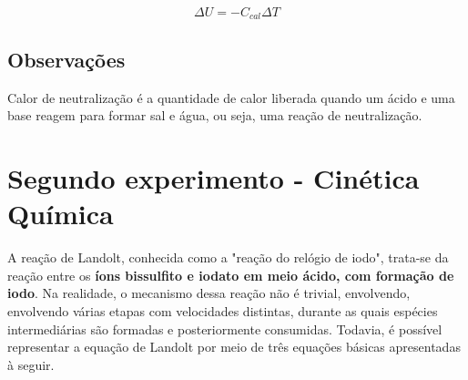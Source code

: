 \documentclass{article}
\begin{document}
\begin{equation}
  \Delta U = - C_{cal} \Delta T
  \label{eq:eqCalorimetro2}
\end{equation}

\subsection{Observações}
Calor de neutralização é a quantidade de calor liberada quando um ácido e uma base reagem para formar sal e água, ou seja, uma reação de neutralização.
\section{Segundo experimento - Cinética Química} 
A reação de Landolt, conhecida como a "reação do relógio de iodo", trata-se da reação entre os \textbf{íons bissulfito e iodato em meio ácido, com formação de iodo}. Na realidade, o mecanismo dessa reação não é trivial, envolvendo, envolvendo várias etapas com velocidades distintas, durante as quais espécies intermediárias são formadas e posteriormente consumidas. Todavia, é possível representar a equação de Landolt por meio de três equações básicas apresentadas à seguir.
\end{document}
